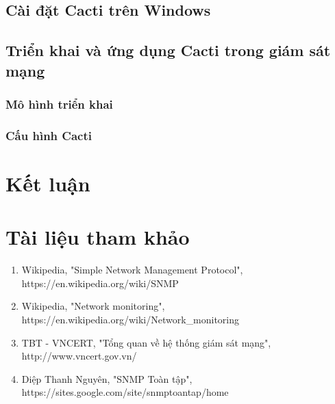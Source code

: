 \documentclass[12pt,oneside,a4paper]{article}
\begin{document}
\subsection{Cài đặt Cacti trên Windows}
\subsection{Triển khai và ứng dụng Cacti trong giám sát mạng}
\subsubsection{Mô hình triển khai}
\subsubsection{Cấu hình Cacti}

\section*{Kết luận}
%

\newpage
\section*{Tài liệu tham khảo}
%
%
\begin{enumerate}
\item{Wikipedia, "Simple Network Management Protocol", https://en.wikipedia.org/wiki/SNMP}
\item{Wikipedia, "Network monitoring", https://en.wikipedia.org/wiki/Network\_monitoring}
\item{TBT - VNCERT, "Tổng quan về hệ thống giám sát mạng", http://www.vncert.gov.vn/}
\item{Diệp Thanh Nguyên, "SNMP Toàn tập", https://sites.google.com/site/snmptoantap/home}
\end{enumerate}
	
\end{document}
